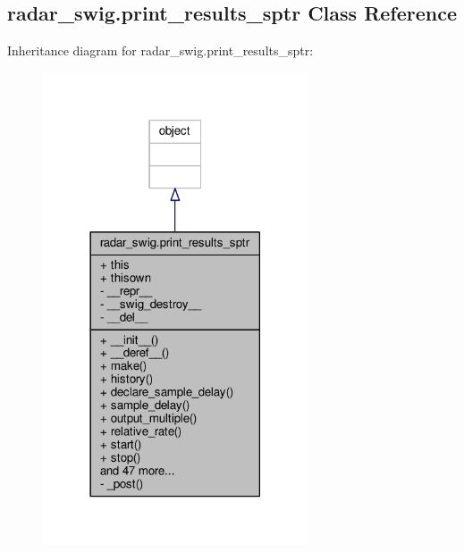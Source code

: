 \subsection{radar\+\_\+swig.\+print\+\_\+results\+\_\+sptr Class Reference}
\label{classradar__swig_1_1print__results__sptr}


Inheritance diagram for radar\+\_\+swig.\+print\+\_\+results\+\_\+sptr\+:
\nopagebreak
\begin{figure}[H]
\begin{center}
\leavevmode
\includegraphics[width=222pt]{d6/d86/classradar__swig_1_1print__results__sptr__inherit__graph}
\end{center}
\end{figure}


